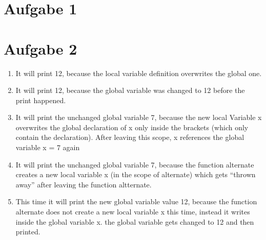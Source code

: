 \documentclass[12pt]{article}
\begin{document}
\lstset{language=C}

\section{Aufgabe 1}


\section{Aufgabe 2}
\begin{enumerate}[1)]
    \item 
        It will print 12, because the local variable definition overwrites the global one.
    \item
        It will print 12, because the global variable was changed to 12 before the print happened.
    \item
        It will print the unchanged global variable 7, because the new local Variable x overwrites the global declaration of x only inside the brackets (which only contain the declaration). After leaving this scope, x references the global variable x = 7 again
    \item
        It will print the unchanged global variable 7, because the function alternate creates a new local variable x (in the scope of alternate) which gets ``thrown away'' after leaving the function altternate. 
    \item
        This time it will print the new global variable value 12, because the function alternate does not create a new local variable x this time, instead it writes inside the global variable x. the global variable gets changed to 12 and then printed.
\end{enumerate}
\end{document}
